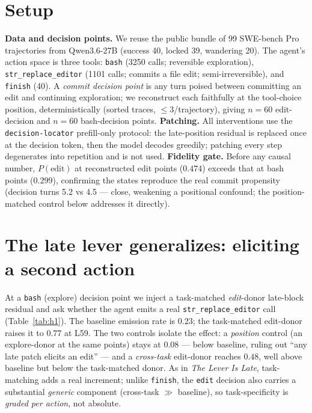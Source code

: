 \documentclass[11pt]{article}
\begin{document}
\section{Setup}\label{sec:setup}
\textbf{Data and decision points.} We reuse the public bundle of 99 SWE-bench Pro~\cite{swebench} trajectories from
Qwen3.6-27B (success 40, locked 39, wandering 20). The agent's action space is three tools: \texttt{bash}
(3250 calls; reversible exploration), \texttt{str\_replace\_editor} (1101 calls; commits a file edit;
semi-irreversible), and \texttt{finish} (40). A \emph{commit decision point} is any turn poised between
committing an edit and continuing exploration; we reconstruct each faithfully at the tool-choice position,
deterministically (sorted traces, $\le 3$/trajectory), giving $n{=}60$ edit-decision and $n{=}60$
bash-decision points. \textbf{Patching.} All interventions use the \texttt{decision-locator} prefill-only
protocol: the late-position residual is replaced once at the decision token, then the model decodes greedily;
patching every step degenerates into repetition and is not used. \textbf{Fidelity gate.} Before any causal
number, $P(\text{edit})$ at reconstructed edit points ($0.474$) exceeds that at bash points ($0.299$), confirming
the states reproduce the real commit propensity (decision turns 5.2 vs 4.5 --- close, weakening a positional
confound; the position-matched control below addresses it directly).

\section{The late lever generalizes: eliciting a second action}\label{sec:elicit}
At a \texttt{bash} (explore) decision point we inject a task-matched \emph{edit}-donor late-block residual and
ask whether the agent emits a real \texttt{str\_replace\_editor} call (Table~\ref{tab:h1}). The baseline
emission rate is $0.23$; the task-matched edit-donor raises it to $0.77$ at L59. The two controls isolate the
effect: a \emph{position} control (an explore-donor at the same points) stays at $0.08$ --- below baseline,
ruling out ``any late patch elicits an edit'' --- and a \emph{cross-task} edit-donor reaches $0.48$, well above
baseline but below the task-matched donor. As in \emph{The Lever Is Late}, task-matching adds a real increment;
unlike \texttt{finish}, the \texttt{edit} decision also carries a substantial \emph{generic} component
(cross-task $\gg$ baseline), so task-specificity is \emph{graded per action}, not absolute.
\end{document}
